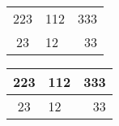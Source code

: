 \documentclass{book} %
\begin{document}
\begin{tabular}{clr}
223&112&333\\
23&12&33\\
\end{tabular}

\begin{tabular}{|c|l|r|}
\hline
223&112&333\\
\hline
23&12&33\\
\hline
\end{tabular}
\end{document}
